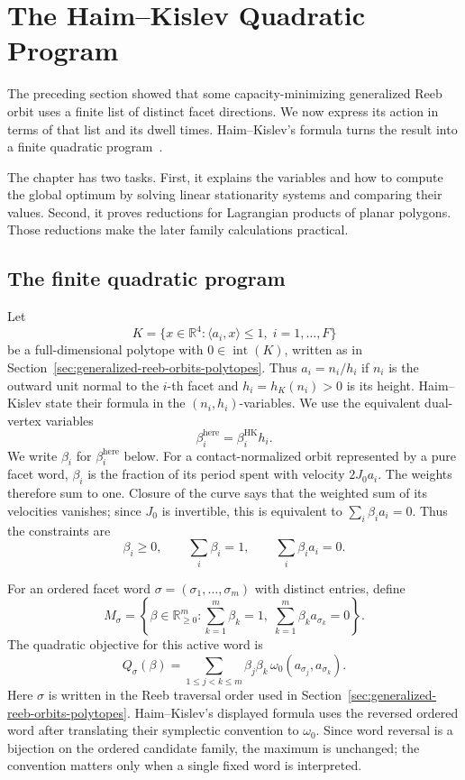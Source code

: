 \section{The Haim--Kislev Quadratic Program}
\label{sec:quadratic-program-algorithm-hk2019}

The preceding section showed that some capacity-minimizing generalized
Reeb orbit uses a finite list of distinct facet directions. We now express
its action in terms of that list and its dwell times. Haim--Kislev's
formula turns the result into a finite quadratic program~\cite{HK2017}.

The chapter has two tasks. First, it explains the variables and how to
compute the global optimum by solving linear stationarity systems and
comparing their values. Second, it proves reductions for Lagrangian
products of planar polygons. Those reductions make the later family
calculations practical.

\subsection{The finite quadratic program}
\label{subsec:quadratic-program-algorithm-hk2019-general-polytopes}

Let
\[
  K=\{x\in\mathbb{R}^4:\langle a_i,x\rangle\leq 1,\;
    i=1,\ldots,F\}
\]
be a full-dimensional polytope with \(0\in\operatorname{int}(K)\), written as
in Section~\ref{sec:generalized-reeb-orbits-polytopes}. Thus
\(a_i=n_i/h_i\) if \(n_i\) is the outward unit normal to the \(i\)-th facet and
\(h_i=h_K(n_i)>0\) is its height. Haim--Kislev state their formula in the
\((n_i,h_i)\)-variables. We use the equivalent dual-vertex variables
\[
  \beta_i^{\mathrm{here}}=\beta_i^{\mathrm{HK}}h_i.
\]
We write \(\beta_i\) for \(\beta_i^{\mathrm{here}}\) below.
For a contact-normalized orbit represented by a pure facet word,
$\beta_i$ is the fraction of its period spent
with velocity $2J_0a_i$. The weights therefore sum to one. Closure of the
curve says that the weighted sum of its velocities vanishes; since $J_0$
is invertible, this is equivalent to $\sum_i\beta_i a_i=0$.
Thus the constraints are
\[
  \beta_i\geq0,\qquad
  \sum_i\beta_i=1,\qquad
  \sum_i\beta_i a_i=0.
\]

For an ordered facet word
\(\sigma=(\sigma_1,\ldots,\sigma_m)\) with distinct entries, define
\[
  M_\sigma
  =
  \left\{
    \beta\in\mathbb{R}_{\geq0}^m:
    \sum_{k=1}^m\beta_k=1,\;
    \sum_{k=1}^m\beta_k a_{\sigma_k}=0
  \right\}.
\]
The quadratic objective for this active word is
\begin{equation}\label{eq:quadratic-program-algorithm-hk2019-q}
  Q_\sigma(\beta)
  =
  \sum_{1\leq j<k\leq m}
    \beta_j\beta_k\,\omega_0(a_{\sigma_j},a_{\sigma_k}).
\end{equation}
Here \(\sigma\) is written in the Reeb traversal order used in
Section~\ref{sec:generalized-reeb-orbits-polytopes}. Haim--Kislev's displayed
formula uses the reversed ordered word after translating their symplectic
convention to \(\omega_0\). Since word reversal is a bijection on the ordered
candidate family, the maximum is unchanged; the convention matters only when a
single fixed word is interpreted.

